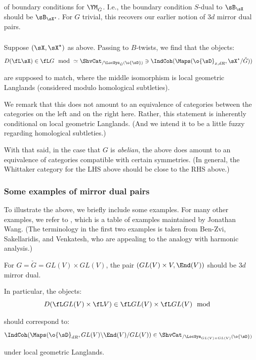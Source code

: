  of boundary conditions for $\YM_{\check{G}}$. I.e., the
boundary condition $S$-dual to $\sB_{\sX}$ should be $\sB_{\sX^{\star}}$.
For $G$ trivial, this recovers our earlier notion of $3d$ mirror dual pairs.

\subsubsection{}

Suppose $(\sX,\sX^{\star})$ as above. Passing to $B$-twists, we find that the objects:
%
\[
D(\fL\sX) \in \fL G\mod \simeq
\ShvCat_{/\LocSys_{\check{G}}(\o{\sD})}
\ni
\IndCoh(\Maps(\o{\sD}_{x,dR},\sX^{\star}/\check{G}))
\]

 are supposed to match, where the middle isomorphism is local geometric
Langlands (considered modulo homological subtleties).

We remark that this does not amount to an equivalence of categories
between the categories on the left and on the right here. Rather, this
statement is inherently conditional on local geometric Langlands.
(And we intend it to be a little fuzzy regarding homological subtleties.)

With that said, in the case that $G$ is \emph{abelian}, the above does
amount to an equivalence of categories compatible with certain symmetries.
(In general, the Whittaker category for the LHS above should be close to the
RHS above.)

\subsubsection{Some examples of mirror dual pairs}

To illustrate the above, we briefly include some examples.
For many other examples, we refer to \cite{wang-table}, which is
a table of examples maintained by Jonathan Wang. (The terminology in the
first two examples is taken from Ben-Zvi, Sakellaridis, and Venkatesh,
who are appealing to the analogy with harmonic analysis.)


\begin{example}
\notready\label{e:godement-jacquet}

For $G = \check{G} = GL(V) \times GL(V)$, the pair
$(GL(V) \times V,\End(V))$ should be $3d$ mirror dual.

In particular, the objects:
%
\[
D(\fL GL(V) \times \fL V) \in \fL GL(V) \times \fL GL(V) \mod
\]

 should correspond to:
%
\[
\IndCoh(\Maps(\o{\sD}_{dR},GL(V) \backslash\End(V)/GL(V)) \in
\ShvCat_{/\LocSys_{GL(V)\times GL(V)}(\o{\sD})}
\]

 under local geometric Langlands.

\end{example}

